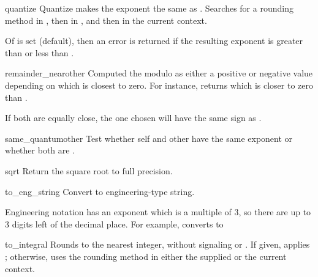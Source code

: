 \begin{methoddesc}{quantize}
  {}
  Quantize makes the exponent the same as .  Searches for a
  rounding method in , then in , and then
  in the current context.

  Of  is set (default), then an error is returned if
  the resulting exponent is greater than  or less than
  .
\end{methoddesc} 

\begin{methoddesc}{remainder_near}{other}
  Computed the modulo as either a positive or negative value depending
  on which is closest to zero.  For instance,
   returns 
  which is closer to zero than .

  If both are equally close, the one chosen will have the same sign
  as .
\end{methoddesc}  

\begin{methoddesc}{same_quantum{other}}
  Test whether self and other have the same exponent or whether both
  are .
\end{methoddesc}

\begin{methoddesc}{sqrt}{}
  Return the square root to full precision.
\end{methoddesc}                    
 
\begin{methoddesc}{to_eng_string}{}
  Convert to engineering-type string.

  Engineering notation has an exponent which is a multiple of 3, so there
  are up to 3 digits left of the decimal place.  For example, converts
   to 
\end{methoddesc}  

\begin{methoddesc}{to_integral}{}                   
  Rounds to the nearest integer, without signaling 
  or .  If given, applies ; otherwise,
  uses the rounding method in either the supplied  or the
  current context.
\end{methoddesc} 

